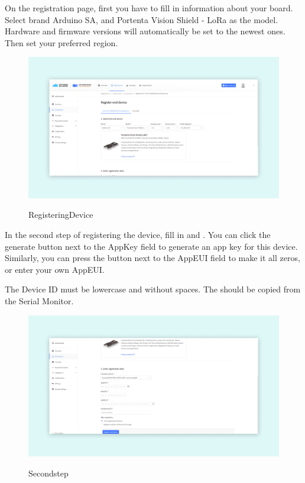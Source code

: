\begin{itemize}
	On the registration page, first you have to fill in information about your board. Select brand Arduino SA, and Portenta Vision Shield - LoRa as the model. Hardware and firmware versions will automatically be set to the newest ones. Then set your preferred region.
	
	\begin{figure}
		\begin{center}
			\includegraphics[width=0.7\linewidth]{Images/LORA/DeviceEUI.png}
			\caption{RegisteringDevice}
			\label{RegisteringDevice} \cite{connecting_to_ttn_portenta_vision_shield:2024}
		\end{center}
	\end{figure}
	
	In the second step of registering the device, fill in  and . You can click the generate button next to the AppKey field to generate an app key for this device. Similarly, you can press the button next to the AppEUI field to make it all zeros, or enter your own AppEUI.
	
	 The Device ID must be lowercase and without spaces. The  should be copied from the Serial Monitor. 
	
	\begin{figure}
		\begin{center}
			\includegraphics[width=0.7\linewidth]{Images/LORA/Secondstep.png}
			\caption{Secondstep}
			\label{Secondstep} \cite{connecting_to_ttn_portenta_vision_shield:2024}
		\end{center}
	\end{figure}
	

\end{itemize}
